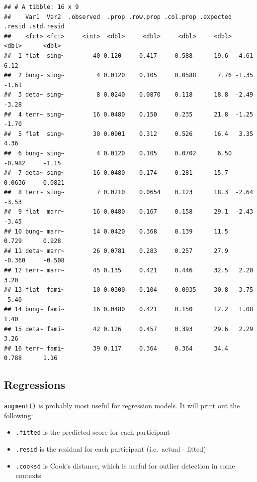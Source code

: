 \documentclass[
]{book}
\providecommand{\tightlist}{%
  \setlength{\itemsep}{0pt}\setlength{\parskip}{0pt}}
\begin{document}
\begin{verbatim}
## # A tibble: 16 x 9
##    Var1  Var2  .observed  .prop .row.prop .col.prop .expected  .resid .std.resid
##    <fct> <fct>     <int>  <dbl>     <dbl>     <dbl>     <dbl>   <dbl>      <dbl>
##  1 flat  sing~        40 0.120     0.417     0.588      19.6   4.61       6.12  
##  2 bung~ sing~         4 0.0120    0.105     0.0588      7.76 -1.35      -1.61  
##  3 deta~ sing~         8 0.0240    0.0870    0.118      18.8  -2.49      -3.28  
##  4 terr~ sing~        16 0.0480    0.150     0.235      21.8  -1.25      -1.70  
##  5 flat  sing~        30 0.0901    0.312     0.526      16.4   3.35       4.36  
##  6 bung~ sing~         4 0.0120    0.105     0.0702      6.50 -0.982     -1.15  
##  7 deta~ sing~        16 0.0480    0.174     0.281      15.7   0.0636     0.0821
##  8 terr~ sing~         7 0.0210    0.0654    0.123      18.3  -2.64      -3.53  
##  9 flat  marr~        16 0.0480    0.167     0.158      29.1  -2.43      -3.45  
## 10 bung~ marr~        14 0.0420    0.368     0.139      11.5   0.729      0.928 
## 11 deta~ marr~        26 0.0781    0.283     0.257      27.9  -0.360     -0.508 
## 12 terr~ marr~        45 0.135     0.421     0.446      32.5   2.20       3.20  
## 13 flat  fami~        10 0.0300    0.104     0.0935     30.8  -3.75      -5.40  
## 14 bung~ fami~        16 0.0480    0.421     0.150      12.2   1.08       1.40  
## 15 deta~ fami~        42 0.126     0.457     0.393      29.6   2.29       3.26  
## 16 terr~ fami~        39 0.117     0.364     0.364      34.4   0.788      1.16
\end{verbatim}

\hypertarget{regressions}{%
\subsection{Regressions}\label{regressions}}

\texttt{augment()} is probably most useful for regression models. It will print out the following:

\begin{itemize}
\tightlist
\item
  \texttt{.fitted} is the predicted score for each participant
\item
  \texttt{.resid} is the residual for each participant (i.e.~actual - fitted)
\item
  \texttt{.cooksd} is Cook's distance, which is useful for outlier detection in some contexts
\end{itemize}
\end{document}
